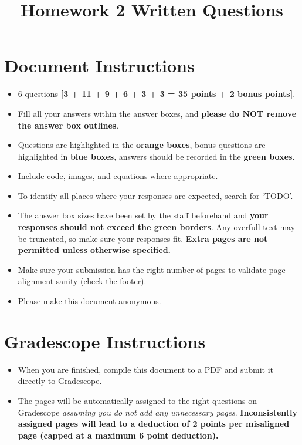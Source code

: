 \documentclass[11pt]{article}
\date{}
\title{\vspace{-1cm}Homework 2 Written Questions}
\begin{document}
\maketitle
\vspace{-3cm}
\thispagestyle{fancy}


\section*{ Document Instructions}
\begin{itemize}
  \item 6 questions \textbf{[3 + 11 + 9 + 6 + 3 + 3 = 35 points + 2 bonus points]}.
  \item Fill all your answers within the answer boxes, and \textbf{please do NOT remove the answer box outlines}.
  \item Questions are highlighted in the \textbf{orange boxes}, bonus questions are highlighted in \textbf{blue boxes}, answers should be recorded in the \textbf{green boxes}.
  \item Include code, images, and equations where appropriate.
  \item To identify all places where your responses are expected, search for `TODO'.
  \item The answer box sizes have been set by the staff beforehand and \textbf{your responses should not exceed the green borders}. Any overfull text may be truncated, so make sure your responses fit. \textbf{Extra pages are not permitted unless otherwise specified.}
  \item Make sure your submission has the right number of pages to validate page alignment sanity (check the footer).
  \item Please make this document anonymous.
\end{itemize}

\section*{ Gradescope Instructions}
\begin{itemize}
  \item When you are finished, compile this document to a PDF and submit it directly to Gradescope. 
  \item The pages will be automatically assigned to the right questions on Gradescope \textit{assuming you do not add any unnecessary pages}. \textbf{Inconsistently assigned pages will lead to a deduction of 2 points per misaligned page (capped at a maximum 6 point deduction).}
\end{itemize}
\pagebreak
\end{document}
